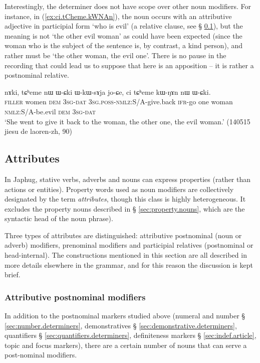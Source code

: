 Interestingly, the determiner  does not have scope over other noun modifiers. For instance, in (\ref{ex:ci.tCheme.kWNAn}), the noun  occurs with an attributive adjective in participial form  `who is evil' (a relative clause, see § \ref{sec:attributes}), but the meaning is not `the other evil woman' as could have been expected (since the woman who is the subject of the sentence is, by contrast, a kind person), and rather must be `the other woman, the evil one'. There is no pause in the recording that could lead us to suppose that  here is an apposition -- it is rather a postnominal relative.

\begin{exe}
\ex \label{ex:ci.tCheme.kWNAn}
\gll nɤki, tɕʰeme nɯ ɯ-ɕki ɯ-kɯ-sɤja jo-ɕe, ci tɕʰeme kɯ-ŋɤn nɯ ɯ-ɕki. \\
\textsc{filler} women \textsc{dem} \textsc{3sg}-\textsc{dat} \textsc{3sg}.\textsc{poss}-\textsc{nmlz}:S/A-give.back \textsc{ifr}-go one woman \textsc{nmlz}:S/A-be.evil \textsc{dem} \textsc{3sg}-\textsc{dat} \\
\glt `She went to give it back to the woman, the other one, the evil woman.' (140515 jiesu de laoren-zh, 90)
\end{exe}


\subsection{Attributes} \label{sec:attributes}
In Japhug, stative verbs, adverbs and nouns can express properties (rather than actions or entities). Property words used as noun modifiers are collectively designated by the term \textit{attributes}, though this class is highly heterogeneous. It excludes the property nouns described in § \ref{sec:property.nouns}, which are the syntactic head of the noun phrase).

Three types of attributes are distinguished: attributive postnominal (noun or adverb) modifiers, prenominal modifiers and participial  relatives (postnominal or head-internal). The constructions mentioned in this section are all described in more details elsewhere in the grammar, and for this reason the discussion is kept brief.

\subsubsection{Attributive postnominal modifiers} \label{ex:attributive.postnominal}
In addition to the postnominal markers studied above (numeral and number § \ref{sec:number.determiners}, demonstratives § \ref{sec:demonstrative.determiners}, quantifiers § \ref{sec:quantifiers.determiners}, definiteness markers § \ref{sec:indef.article}, topic and focus markers), there are a certain number of nouns that can serve a post-nominal modifiers.

